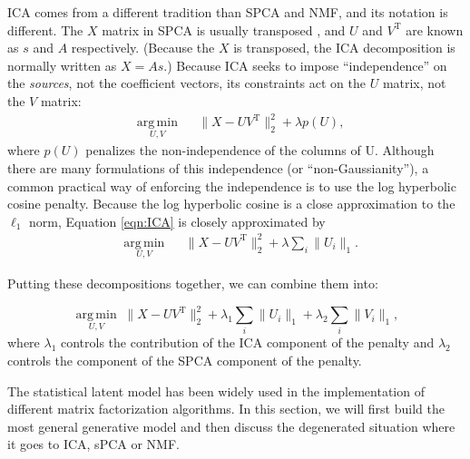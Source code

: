 \documentclass{elsarticle}\usepackage{graphicx, color}
\newcommand{\transpose}{^\mathrm{T}}
\begin{document}
ICA comes from a different tradition than SPCA and NMF, and its notation is different.  The $X$ matrix in SPCA is usually transposed \cite{hyvarinen1999fast}, and $U$ and $V\transpose$ are known as $s$ and $A$ respectively.  (Because the $X$ is transposed, the ICA decomposition is normally written as $X = As$.)  Because ICA seeks to impose ``independence'' on the \textit{sources}, not the coefficient vectors, its constraints act on the $U$ matrix, not the $V$ matrix: 
\begin{equation}
\begin{aligned}
&\underset{U,V}{\operatorname{arg\,min}} & & \| X - UV\transpose \|_2^2 + \lambda p(U),
\end{aligned}
\label{eqn:ICA}
\end{equation}
where $p(U)$ penalizes the non-independence of the columns of U.  Although there are many formulations of this independence (or ``non-Gaussianity''), a common practical way of enforcing the independence is to use the log hyperbolic cosine penalty.  Because the log hyperbolic cosine is a close approximation to the $\ell_1$ norm, Equation \ref{eqn:ICA} is closely approximated by 
\begin{equation}
\begin{aligned}
&\underset{U,V}{\operatorname{arg\,min}} & & \| X - UV\transpose \|_2^2 + \lambda \sum_i \|U_i\|_1.
\end{aligned}
\end{equation}

Putting these decompositions together, we can combine them into: 

\begin{equation}
\label{eq:eanat}
\underset{U,V}{\operatorname{arg\,min}} \; \| X - UV\transpose \|_2^2 + \lambda_1 \sum_i \|U_i\|_1 + \lambda_2 \sum_i \|V_i\|_1,
\end{equation}
where $\lambda_1$ controls the contribution of the ICA component of the penalty and $\lambda_2$ controls the component of the SPCA component of the penalty. 


The statistical latent model has been widely used in the
implementation of different matrix factorization algorithms. In this
section, we will first build the most general  generative model and
then discuss the degenerated situation where it goes to ICA, sPCA or
NMF. 
\end{document}
